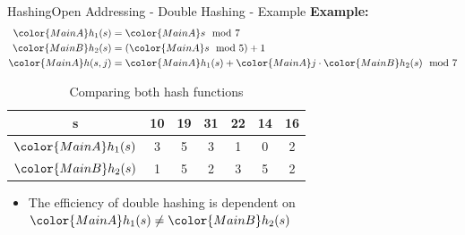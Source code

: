 
\begin{frame}{Hashing}{Open Addressing - Double Hashing - Example}
  \textbf{Example:}
  {\color{MainA}
  \begin{align*}
    {\color{MainA}h_1(s)} &= {\color{MainA}s \mod 7}\\
    {\color{MainB}h_2(s)}
      &= \left({\color{MainA}s} \mod 5\right) + 1\\
    {\color{MainA}h(s,j)}
      &= {\color{MainA}h_1(s)}
      + {\color{MainA}j} \cdot {\color{MainB}h_2(s)}
      \mod 7
  \end{align*}}
  \vspace{-1.0em}
  \begin{table}[!h]
    \caption{Comparing both hash functions}
    \begin{tabular}{c|cccccc}
      {\color{MainA}s} & 10 & 19 & 31 & 22 & 14 & 16\\
      \midrule
      ${\color{MainA}h_1(s)}$ & 3 & 5 & 3 & 1 & 0 & 2\\
      ${\color{MainB}h_2(s)}$ & 1 & 5 & 2 & 3 & 5 & 2
    \end{tabular}
  \end{table}
  \begin{itemize}
    \item
      The efficiency of double hashing is dependent on
      \begin{math}
       {\color{MainA}h_1(s)} \neq {\color{MainB}h_2(s)}
      \end{math}
 \end{itemize}
\end{frame}


